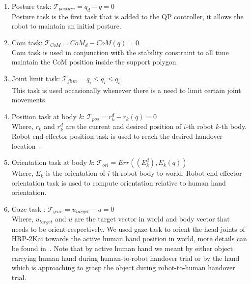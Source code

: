 \begin{enumerate}[start=1,label={\arabic*.}]

\item Posture task: $\mathscr{T}_{posture} = q_d - q = 0$\\
Posture task is the first task that is added to the QP controller, it allows the robot to maintain an initial posture.

\item Com task: $\mathscr{T}_{CoM} = CoM_d - CoM(q) = 0$\\
Com task is used in conjunction with the stability constraint to all time maintain the CoM position inside the support polygon. 

\item Joint limit task: $\mathscr{T}_{jlim} = \underline{q_i} \leq q_i \leq \overline{q_i}$\\
This task is used occasionally whenever there is a need to limit certain joint movements.  

\item Position task at body $k$: $\mathscr{T}_{pos} = r^d_k - r_k(q) = 0$\\
Where, $r_k$ and $r^d_k$ are the current and desired position of $i$-th robot $k$-th body. Robot end-effector position task is used to reach the desired handover location~\cite{ladder-HRP-2Kai}.

\item Orientation task at body $k$: $\mathscr{T}_{ori} = Err((E^d_k),  E_k(q))$\\
Where, $E_k$ is the orientation of $i$-th robot body to world. Robot end-effector orientation task is used to compute orientation relative to human hand orientation.

\item Gaze task : $\mathscr{T}_{gaze} =u_{target} - u = 0$\\
Where, $u_{target}$  and $u$ are the target vector in world and body vector that needs to be orient respectively. We used gaze task to orient the head joints of HRP-2Kai towards the active human hand position in world, more details can be found in~\cite{samy2017VecOriTask}. Note that by active human hand we meant by either object carrying human hand during human-to-robot handover trial or by the hand which is approaching to grasp the object during robot-to-human handover trial.

\end{enumerate}


\clearpage

